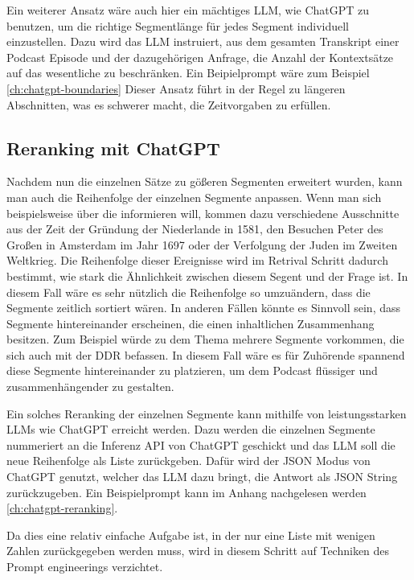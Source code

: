 Ein weiterer Ansatz wäre auch hier ein mächtiges LLM, wie ChatGPT zu benutzen, um die richtige Segmentlänge für jedes Segment individuell einzustellen.
Dazu wird das LLM instruiert, aus dem gesamten Transkript einer Podcast Episode und der dazugehörigen Anfrage, die Anzahl der Kontextsätze auf das wesentliche zu beschränken.
Ein Beipielprompt wäre zum Beispiel \autoref{ch:chatgpt-boundaries}
Dieser Ansatz führt in der Regel zu längeren Abschnitten, was es schwerer macht, die Zeitvorgaben zu erfüllen.

\subsection{Reranking mit ChatGPT}

Nachdem nun die einzelnen Sätze zu gößeren Segmenten erweitert wurden, kann man auch die Reihenfolge der einzelnen Segmente anpassen.
Wenn man sich beispielsweise über die  informieren will, kommen dazu verschiedene Ausschnitte aus der Zeit der Gründung der Niederlande in 1581, den Besuchen Peter des Großen in Amsterdam im Jahr 1697 oder der Verfolgung der Juden im Zweiten Weltkrieg.
Die Reihenfolge dieser Ereignisse wird im Retrival Schritt dadurch bestimmt, wie stark die Ähnlichkeit zwischen diesem Segent und der Frage ist.
In diesem Fall wäre es sehr nützlich die Reihenfolge so umzuändern, dass die Segmente zeitlich sortiert wären.
In anderen Fällen könnte es Sinnvoll sein, dass Segmente hintereinander erscheinen, die einen inhaltlichen Zusammenhang besitzen.
Zum Beispiel würde zu dem Thema  mehrere Segmente vorkommen, die sich auch mit der DDR befassen.
In diesem Fall wäre es für Zuhörende spannend diese Segmente hintereinander zu platzieren, um dem Podcast flüssiger und zusammenhängender zu gestalten.

Ein solches Reranking der einzelnen Segmente kann mithilfe von leistungsstarken LLMs wie ChatGPT erreicht werden.
Dazu werden die einzelnen Segmente nummeriert an die Inferenz API von ChatGPT geschickt und das LLM soll die neue Reihenfolge als Liste zurückgeben.
Dafür wird der JSON Modus von ChatGPT genutzt, welcher das LLM dazu bringt, die Antwort als JSON String zurückzugeben.
Ein Beispielprompt kann im Anhang nachgelesen werden \autoref{ch:chatgpt-reranking}.

Da dies eine relativ einfache Aufgabe ist, in der nur eine Liste mit wenigen Zahlen zurückgegeben werden muss, wird in diesem Schritt auf Techniken des Prompt engineerings verzichtet.

